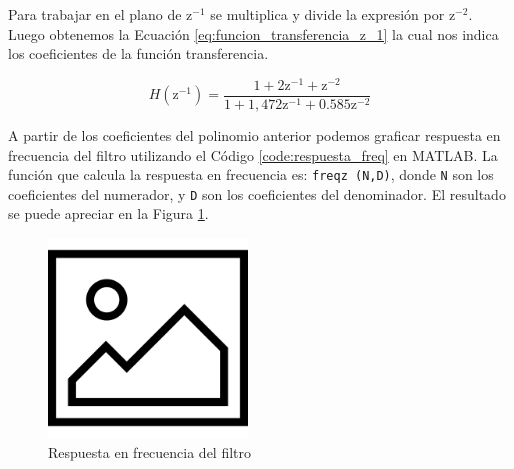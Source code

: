 Para trabajar en el plano de $\textrm{z}^{-1}$ se multiplica y divide la expresión por $\textrm{z}^{-2}$. Luego obtenemos la Ecuación \ref{eq:funcion_transferencia_z_1} la cual nos indica los coeficientes de la función transferencia.

\begin{equation}
  H(\textrm{z}^{-1}) = \frac
  {1 + 2\textrm{z}^{-1} + \textrm{z}^{-2}}
  {1 + 1,472\textrm{z}^{-1} + 0.585\textrm{z}^{-2}}
  \label{eq:funcion_transferencia_z_1}
\end{equation}

A partir de los coeficientes del polinomio anterior podemos graficar respuesta en frecuencia del filtro utilizando el Código \ref{code:respuesta_freq} en MATLAB. La función que calcula la respuesta en frecuencia es: \lstinline{freqz (N,D)}, donde \lstinline{N} son los coeficientes del numerador, y \lstinline{D} son los coeficientes del denominador. El resultado se puede apreciar en la Figura \ref{fig:respuesta_frecuencia_filtro}.



\begin{figure}[H]
  \centering
  \includegraphics[width=150pt]{images/placeholder.png}
  \caption{Respuesta en frecuencia del filtro}
  \label{fig:respuesta_frecuencia_filtro}
\end{figure}